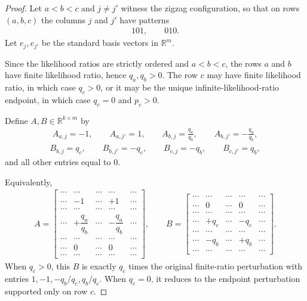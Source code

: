 \documentclass{article}
\theoremstyle{plain}
\theoremstyle{definition}
\theoremstyle{plain}
\begin{document}
\begin{proof}
Let $a<b<c$ and $j\neq j'$ witness the zigzag configuration, so that on rows $(a,b,c)$ the columns $j$ and $j'$ have patterns
\begin{align*}
    101,\qquad 010.
\end{align*}
Let $e_j,e_{j'}$ be the standard basis vectors in $\mathbb{R}^m$.

Since the likelihood ratios are strictly ordered and $a<b<c$, the rows $a$ and $b$ have finite likelihood ratio, hence $q_a,q_b>0$. The row $c$ may have finite likelihood ratio, in which case $q_c>0$, or it may be the unique infinite-likelihood-ratio endpoint, in which case $q_c=0$ and $p_c>0$.

Define $A,B\in\mathbb{R}^{k\times m}$ by
\begin{align*}
    A_{a,j}=-1,\qquad A_{a,j'}=1,\qquad
    A_{b,j}=\frac{q_a}{q_b},\qquad A_{b,j'}=-\frac{q_a}{q_b},
\end{align*}
\begin{align*}
    B_{b,j}=q_c,\qquad B_{b,j'}=-q_c,\qquad
    B_{c,j}=-q_b,\qquad B_{c,j'}=q_b,
\end{align*}
and all other entries equal to $0$.

Equivalently,
\begin{align*}
    A=
    \begin{bmatrix}
        \cdots & \cdots & \cdots & \cdots & \cdots \\
        \cdots & -1 & \cdots & +1 & \cdots \\
        \cdots & \cdots & \cdots & \cdots & \cdots \\
        \cdots & +\dfrac{q_a}{q_b} & \cdots & -\dfrac{q_a}{q_b} & \cdots \\
        \cdots & \cdots & \cdots & \cdots & \cdots \\
        \cdots & 0 & \cdots & 0 & \cdots \\
        \cdots & \cdots & \cdots & \cdots & \cdots
    \end{bmatrix},
    \qquad
    B=
    \begin{bmatrix}
        \cdots & \cdots & \cdots & \cdots & \cdots \\
        \cdots & 0 & \cdots & 0 & \cdots \\
        \cdots & \cdots & \cdots & \cdots & \cdots \\
        \cdots & +q_c & \cdots & -q_c & \cdots \\
        \cdots & \cdots & \cdots & \cdots & \cdots \\
        \cdots & -q_b & \cdots & +q_b & \cdots \\
        \cdots & \cdots & \cdots & \cdots & \cdots
    \end{bmatrix}.
\end{align*}
When $q_c>0$, this $B$ is exactly $q_c$ times the original finite-ratio perturbation with entries $1,-1,-q_b/q_c,q_b/q_c$. When $q_c=0$, it reduces to the endpoint perturbation supported only on row $c$.


\end{proof}
\end{document}
